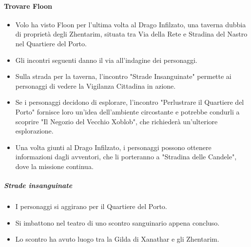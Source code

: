 \documentclass{article}
\begin{document}
\paragraph{Trovare Floon}
\begin{itemize}
    \item Volo ha visto Floon per l'ultima volta al Drago Infilzato, una taverna dubbia di proprietà degli Zhentarim, situata tra Via della Rete e Stradina del Nastro nel Quartiere del Porto.
    \item Gli incontri seguenti danno il via all'indagine dei personaggi.
    \item Sulla strada per la taverna, l'incontro "Strade Insanguinate" permette ai personaggi di vedere la Vigilanza Cittadina in azione.
    \item Se i personaggi decidono di esplorare, l'incontro "Perlustrare il Quartiere del Porto" fornisce loro un'idea dell'ambiente circostante e potrebbe condurli a scoprire "Il Negozio del Vecchio Xoblob", che richiederà un'ulteriore esplorazione.
    \item Una volta giunti al Drago Infilzato, i personaggi possono ottenere informazioni dagli avventori, che li porteranno a "Stradina delle Candele", dove la missione continua.
\end{itemize}
                        \subparagraph{Strade insanguinate}
                        \begin{itemize}
                            \item I personaggi si aggirano per il Quartiere del Porto.
                            \item Si imbattono nel teatro di uno scontro sanguinario appena concluso.
                            \item Lo scontro ha avuto luogo tra la Gilda di Xanathar e gli Zhentarim.
                        \end{itemize}
\end{document}
